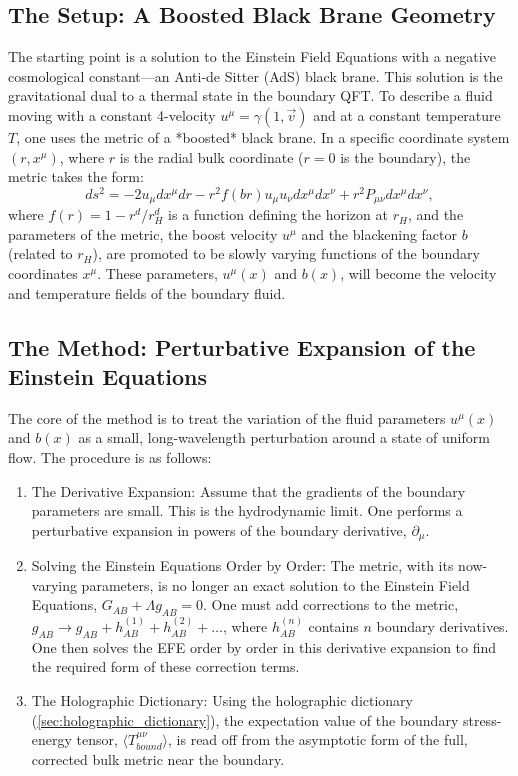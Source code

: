 \documentclass[11pt, letterpaper]{report}
\theoremstyle{plain} %
\theoremstyle{definition} %
\theoremstyle{remark} %
\begin{document}
\subsection{The Setup: A Boosted Black Brane Geometry}
The starting point is a solution to the Einstein Field Equations with a negative cosmological constant—an Anti-de Sitter (AdS) black brane. This solution is the gravitational dual to a thermal state in the boundary QFT. To describe a fluid moving with a constant 4-velocity $u^\mu = \gamma(1, \vec{v})$ and at a constant temperature $T$, one uses the metric of a *boosted* black brane. In a specific coordinate system $(r, x^\mu)$, where $r$ is the radial bulk coordinate ($r=0$ is the boundary), the metric takes the form:
\begin{equation}
    ds^2 = -2u_\mu dx^\mu dr - r^2 f(b r) u_\mu u_\nu dx^\mu dx^\nu + r^2 P_{\mu\nu} dx^\mu dx^\nu,
\end{equation}
where $f(r) = 1 - r^d/r_H^d$ is a function defining the horizon at $r_H$, and the parameters of the metric, the boost velocity $u^\mu$ and the blackening factor $b$ (related to $r_H$), are promoted to be slowly varying functions of the boundary coordinates $x^\mu$. These parameters, $u^\mu(x)$ and $b(x)$, will become the velocity and temperature fields of the boundary fluid.

\subsection{The Method: Perturbative Expansion of the Einstein Equations}
The core of the method is to treat the variation of the fluid parameters $u^\mu(x)$ and $b(x)$ as a small, long-wavelength perturbation around a state of uniform flow. The procedure is as follows:
\begin{enumerate}
    \item The Derivative Expansion: Assume that the gradients of the boundary parameters are small. This is the hydrodynamic limit. One performs a perturbative expansion in powers of the boundary derivative, $\partial_\mu$.
    \item Solving the Einstein Equations Order by Order: The metric, with its now-varying parameters, is no longer an exact solution to the Einstein Field Equations, $G_{AB} + \Lambda g_{AB} = 0$. One must add corrections to the metric, $g_{AB} \to g_{AB} + h_{AB}^{(1)} + h_{AB}^{(2)} + \dots$, where $h_{AB}^{(n)}$ contains $n$ boundary derivatives. One then solves the EFE order by order in this derivative expansion to find the required form of these correction terms.
    \item The Holographic Dictionary: Using the holographic dictionary (\cref{sec:holographic_dictionary}), the expectation value of the boundary stress-energy tensor, $\langle T^{\mu\nu}_{bound} \rangle$, is read off from the asymptotic form of the full, corrected bulk metric near the boundary.
\end{enumerate}
\end{document}
